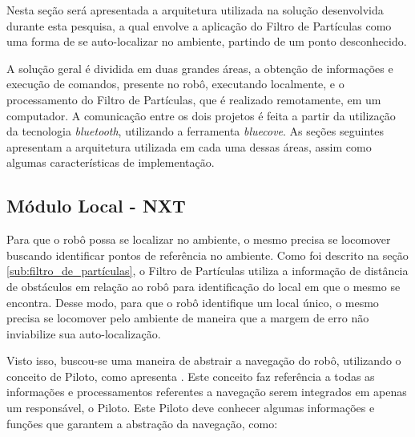 	Nesta seção será apresentada a arquitetura utilizada na solução desenvolvida durante esta pesquisa, a qual envolve a aplicação do Filtro
	de Partículas como uma forma de se auto-localizar no ambiente, partindo de um ponto desconhecido.

	A solução geral é dividida em duas grandes áreas, a obtenção de informações e execução de comandos, presente no robô, executando localmente, e
	o processamento do Filtro de Partículas, que é realizado remotamente, em um computador. A comunicação entre os dois projetos é feita a partir
	da utilização da tecnologia \textit{bluetooth}, utilizando a ferramenta \textit{bluecove}. As seções seguintes apresentam a arquitetura
	utilizada em cada uma dessas áreas, assim como algumas características de implementação.

	\subsection{Módulo Local - NXT}


	Para que o robô possa se localizar no ambiente, o mesmo precisa se locomover buscando identificar pontos de referência no ambiente. Como foi descrito na
	seção \ref{sub:filtro_de_partículas}, o Filtro de Partículas utiliza a informação de distância de obstáculos em relação ao robô para identificação
	do local em que o mesmo se encontra. Desse modo, para que o robô identifique um local único, o mesmo precisa se locomover pelo ambiente de maneira
	que a margem de erro não inviabilize sua auto-localização.

	Visto isso, buscou-se uma maneira de abstrair a navegação do robô, utilizando o conceito de Piloto, como apresenta \cite{legonxj}. Este conceito
	faz referência a todas as informações e processamentos referentes a navegação serem integrados em apenas um responsável, o Piloto. Este Piloto
	deve conhecer algumas informações e funções que garantem a abstração da navegação, como:

